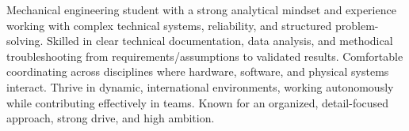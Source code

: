 
\begin{cvparagraph}
Mechanical engineering student with a strong analytical mindset and experience working with complex technical systems, reliability, and structured problem-solving. Skilled in clear technical documentation, data analysis, and methodical troubleshooting from requirements/assumptions to validated results. Comfortable coordinating across disciplines where hardware, software, and physical systems interact. Thrive in dynamic, international environments, working autonomously while contributing effectively in teams. Known for an organized, detail-focused approach, strong drive, and high ambition.
\end{cvparagraph}
